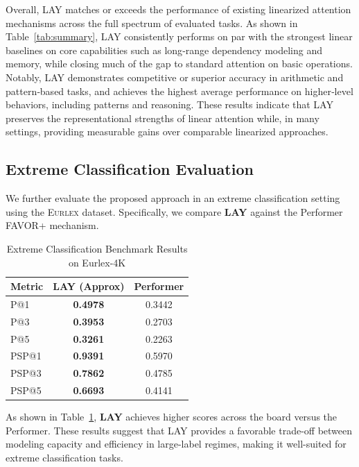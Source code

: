 \documentclass{article}
\begin{document}
Overall, LAY matches or exceeds the performance of existing linearized attention mechanisms across the full spectrum of evaluated tasks. As shown in Table~\ref{tab:summary}, LAY consistently performs on par with the strongest linear baselines on core capabilities such as long‑range dependency modeling and memory, while closing much of the gap to standard attention on basic operations. Notably, LAY demonstrates competitive or superior accuracy in arithmetic and pattern‑based tasks, and achieves the highest average performance on higher‑level behaviors, including patterns and reasoning. These results indicate that LAY preserves the representational strengths of linear attention while, in many settings, providing measurable gains over comparable linearized approaches.

\subsection{Extreme Classification Evaluation}
\label{subsec:extreme-classification}

We further evaluate the proposed approach in an extreme classification setting using the \textsc{Eurlex} dataset. Specifically, we compare \textbf{LAY} against the Performer FAVOR+ mechanism.

\begin{table}[htbp]
\centering
\caption{Extreme Classification Benchmark Results on Eurlex-4K}
\label{tab:extreme_results}
\begin{tabular}{lcc}
\toprule
Metric & LAY (Approx) & Performer \\
\midrule
P@1 & \textbf{0.4978} & 0.3442 \\
P@3 & \textbf{0.3953} & 0.2703 \\
P@5 & \textbf{0.3261} & 0.2263 \\
PSP@1 & \textbf{0.9391} & 0.5970 \\
PSP@3 & \textbf{0.7862} & 0.4785 \\
PSP@5 & \textbf{0.6693} & 0.4141 \\
\bottomrule
\end{tabular}
\end{table}

As shown in Table~\ref{tab:extreme_results}, \textbf{LAY} achieves higher scores across the board versus the Performer. These results suggest that LAY provides a favorable trade-off between modeling capacity and efficiency in large-label regimes, making it well-suited for extreme classification tasks.
\end{document}
